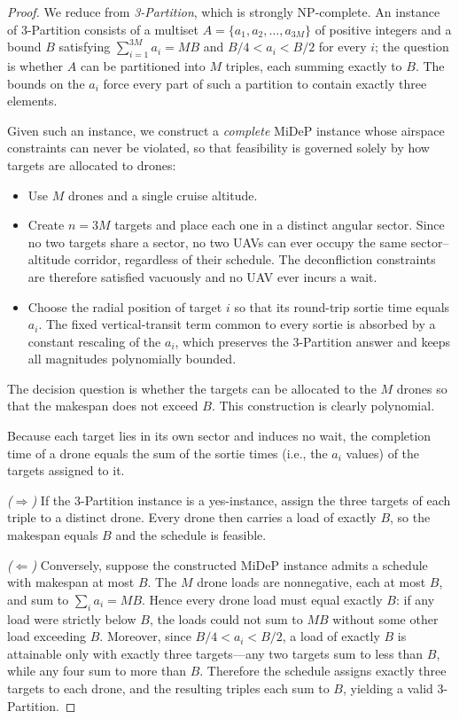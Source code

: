 \documentclass[subscriptcorrection,upint,nolists, varvw,barcolor=Goldenrod3,mathalfa=cal=euler,balance,hyphenate,french]{asmejour} %
\begin{document}
\begin{proof}
We reduce from \emph{3-Partition}, which is strongly NP-complete. An instance of 3-Partition consists of a multiset $A=\{a_1,a_2,\dots,a_{3M}\}$ of positive integers and a bound $B$ satisfying $\sum_{i=1}^{3M} a_i = MB$ and $B/4 < a_i < B/2$ for every $i$; the question is whether $A$ can be partitioned into $M$ triples, each summing exactly to $B$. The bounds on the $a_i$ force every part of such a partition to contain exactly three elements.

Given such an instance, we construct a \emph{complete} MiDeP instance whose airspace constraints can never be violated, so that feasibility is governed solely by how targets are allocated to drones:
\begin{itemize}
    \item Use $M$ drones and a single cruise altitude.
    \item Create $n=3M$ targets and place each one in a distinct angular sector. Since no two targets share a sector, no two UAVs can ever occupy the same sector--altitude corridor, regardless of their schedule. The deconfliction constraints are therefore satisfied vacuously and no UAV ever incurs a wait.
    \item Choose the radial position of target $i$ so that its round-trip sortie time equals $a_i$. The fixed vertical-transit term common to every sortie is absorbed by a constant rescaling of the $a_i$, which preserves the 3-Partition answer and keeps all magnitudes polynomially bounded.
\end{itemize}
The decision question is whether the targets can be allocated to the $M$ drones so that the makespan does not exceed $B$. This construction is clearly polynomial.

Because each target lies in its own sector and induces no wait, the completion time of a drone equals the sum of the sortie times (i.e., the $a_i$ values) of the targets assigned to it.

\smallskip
\noindent\emph{($\Rightarrow$)} If the 3-Partition instance is a yes-instance, assign the three targets of each triple to a distinct drone. Every drone then carries a load of exactly $B$, so the makespan equals $B$ and the schedule is feasible.

\smallskip
\noindent\emph{($\Leftarrow$)} Conversely, suppose the constructed MiDeP instance admits a schedule with makespan at most $B$. The $M$ drone loads are nonnegative, each at most $B$, and sum to $\sum_i a_i = MB$. Hence every drone load must equal exactly $B$: if any load were strictly below $B$, the loads could not sum to $MB$ without some other load exceeding $B$. Moreover, since $B/4 < a_i < B/2$, a load of exactly $B$ is attainable only with exactly three targets---any two targets sum to less than $B$, while any four sum to more than $B$. Therefore the schedule assigns exactly three targets to each drone, and the resulting triples each sum to $B$, yielding a valid 3-Partition.


\end{proof}
\end{document}
